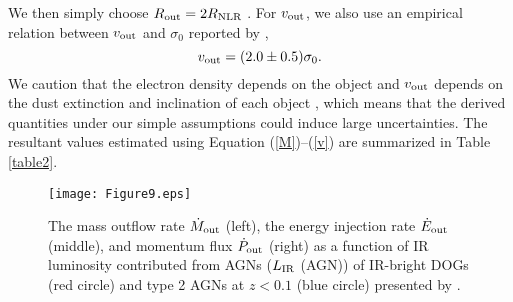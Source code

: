 \documentclass[twocolumn]{aastex6}
\begin{document}
We then simply choose $R_{\rm out} = 2 R_{\rm NLR}$ \citep{Bae_17}.
For $v_{\rm out}$, we also use an empirical relation between $v_{\rm out}$ and $\sigma_0$ reported by \cite{Bae_17},
\begin{equation}
\label{v}
v_{\rm out} = (2.0 \pm 0.5) \sigma_0.
\end{equation}
We caution that the electron density depends on the object and $v_{\rm out}$ depends on the dust extinction and inclination of each object \citep[see][and references therein]{Greene,Harrison,Bae_17}, which means that the derived quantities under our simple assumptions could induce large uncertainties.
The resultant values estimated using Equation (\ref{M})--(\ref{v}) are summarized in Table \ref{table2}.

   \begin{figure}
   \centering
   \texttt{[image: Figure9.eps]}
   \caption{The mass outflow rate $\dot{M}_{\rm out}$ (left), the energy injection rate $\dot{E}_{\rm out}$ (middle), and momentum flux $\dot{P}_{\rm out}$ (right) as a function of IR luminosity contributed from AGNs ($L_{\rm IR}$ (AGN)) of IR-bright DOGs (red circle) and  type 2 AGNs at $z < 0.1$ (blue circle) presented by \cite{Bae_17}.}
   \label{energy}
   \end{figure}
\end{document}
